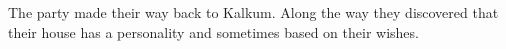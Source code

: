 The party made their way back to Kalkum.
Along the way they discovered that their house has a personality and sometimes based on their wishes.
